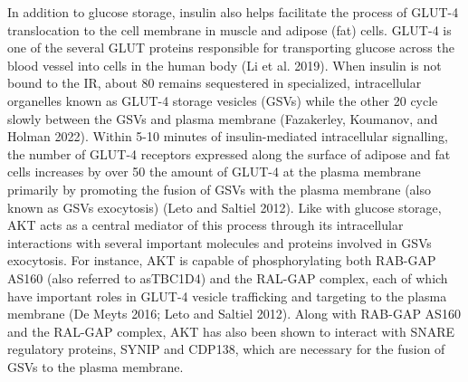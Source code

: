 \documentclass{article}
\begin{document}
In addition to glucose storage, insulin also helps facilitate the process of GLUT-4 translocation to the cell membrane
in muscle and adipose (fat) cells. GLUT-4 is one of the several GLUT proteins responsible for transporting glucose across
the blood vessel into cells in the human body (Li et al. 2019). When insulin is not bound to the IR, about 80%
remains sequestered in specialized, intracellular organelles known as GLUT-4 storage vesicles (GSVs) while the other 20%
cycle slowly between the GSVs and plasma membrane (Fazakerley, Koumanov, and Holman 2022). Within 5-10 minutes of
insulin-mediated intracellular signalling, the number of GLUT-4 receptors expressed along the surface of adipose and fat cells
increases by over 50%
the amount of GLUT-4 at the plasma membrane primarily by promoting the fusion of GSVs with the plasma membrane (also
known as GSVs exocytosis) (Leto and Saltiel 2012). Like with glucose storage, AKT acts as a central mediator of this process
through its intracellular interactions with several important molecules and proteins involved in GSVs exocytosis. For instance,
AKT is capable of phosphorylating both RAB-GAP AS160 (also referred to asTBC1D4) and the RAL-GAP complex, each of
which have important roles in GLUT-4 vesicle trafficking and targeting to the plasma membrane (De Meyts 2016; Leto and
Saltiel 2012). Along with RAB-GAP AS160 and the RAL-GAP complex, AKT has also been shown to interact with SNARE
regulatory proteins, SYNIP and CDP138, which are necessary for the fusion of GSVs to the plasma membrane.
\end{document}
